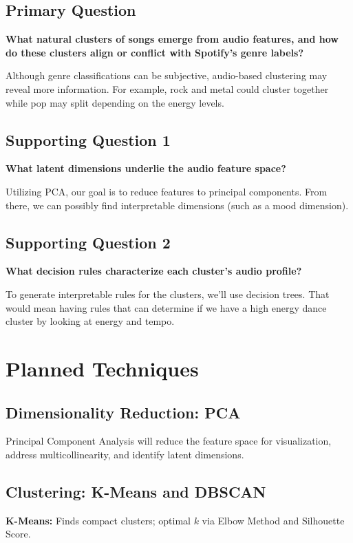 \documentclass[10pt,twocolumn]{article}
\begin{document}
\subsection{Primary Question}
\textbf{What natural clusters of songs emerge from audio features, and how do these clusters align or conflict with Spotify's genre labels?}

Although genre classifications can be subjective, audio-based clustering may reveal more information. For example, rock and metal could cluster together while pop may split depending on the energy levels. 

\subsection{Supporting Question 1}
\textbf{What latent dimensions underlie the audio feature space?}

Utilizing PCA, our goal is to reduce features to principal components. From there, we can possibly find interpretable dimensions (such as a mood dimension).

\subsection{Supporting Question 2}
\textbf{What decision rules characterize each cluster's audio profile?}

To generate interpretable rules for the clusters, we'll use decision trees. That would mean having rules that can determine if we have a high energy dance cluster by looking at energy and tempo.

\section{Planned Techniques}

\subsection{Dimensionality Reduction: PCA}
Principal Component Analysis will reduce the feature space for visualization, address multicollinearity, and identify latent dimensions.

\subsection{Clustering: K-Means and DBSCAN}
\textbf{K-Means:} Finds compact clusters; optimal $k$ via Elbow Method and Silhouette Score.
\end{document}
